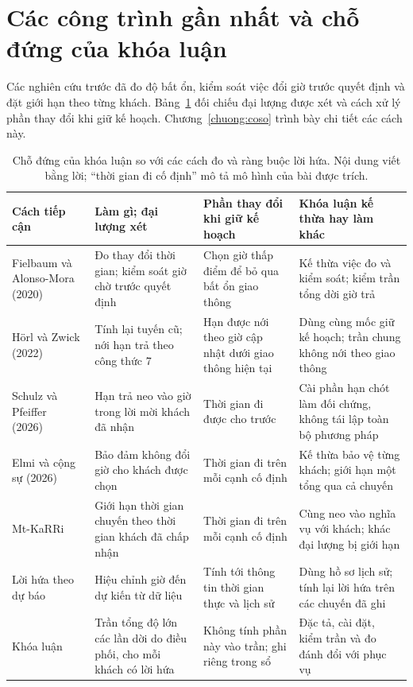 \section{Các công trình gần nhất và chỗ đứng của khóa luận}
\label{muc:c1-lienquan}

Các nghiên cứu trước đã đo độ bất ổn, kiểm soát việc đổi giờ trước quyết định và đặt giới hạn theo từng khách.
Bảng~\ref{bang:c1-chodung} đối chiếu đại lượng được xét và cách xử lý phần thay đổi khi giữ kế hoạch.
Chương~\ref{chuong:coso} trình bày chi tiết các cách này.

\begin{table}[htbp]
\centering
\caption{Chỗ đứng của khóa luận so với các cách đo và ràng buộc lời hứa. Nội dung viết bằng lời;
“thời gian đi cố định” mô tả mô hình của bài được trích.}
\label{bang:c1-chodung}
\footnotesize
\begin{tabular}{@{}p{2.8cm}p{4.0cm}p{3.3cm}p{4.5cm}@{}}
\toprule
\textbf{Cách tiếp cận} & \textbf{Làm gì; đại lượng xét} &
\textbf{Phần thay đổi khi giữ kế hoạch} & \textbf{Khóa luận kế thừa hay làm khác}\\
\midrule
Fielbaum và Alonso-Mora (2020)~\cite{fielbaum2020}
& Đo thay đổi thời gian; kiểm soát giờ chờ trước quyết định
& Chọn giờ thấp điểm để bỏ qua bất ổn giao thông
& Kế thừa việc đo và kiểm soát; kiểm trần tổng dời giờ trả\\
Hörl và Zwick (2022)~\cite{horl2022}
& Tính lại tuyến cũ; nới hạn trả theo công thức 7
& Hạn được nới theo giờ cập nhật dưới giao thông hiện tại
& Dùng cùng mốc giữ kế hoạch; trần chung không nới theo giao thông\\
Schulz và Pfeiffer (2026)~\cite{schulz2026}
& Hạn trả neo vào giờ trong lời mời khách đã nhận
& Thời gian đi được cho trước
& Cài phần hạn chót làm đối chứng, không tái lập toàn bộ phương pháp\\
Elmi và cộng sự (2026)~\cite{elmi2026}
& Bảo đảm không đổi giờ cho khách được chọn
& Thời gian đi trên mỗi cạnh cố định
& Kế thừa bảo vệ từng khách; giới hạn một tổng qua cả chuyến\\
Mt-KaRRi~\cite{laupichler2026}
& Giới hạn thời gian chuyến theo thời gian khách đã chấp nhận
& Thời gian đi trên mỗi cạnh cố định
& Cùng neo vào nghĩa vụ với khách; khác đại lượng bị giới hạn\\
Lời hứa theo dự báo~\cite{hu2022}
& Hiệu chỉnh giờ đến dự kiến từ dữ liệu
& Tính tới thông tin thời gian thực và lịch sử
& Dùng hồ sơ lịch sử; tính lại lời hứa trên các chuyến đã ghi\\
Khóa luận
& Trần tổng độ lớn các lần dời do điều phối, cho mỗi khách có lời hứa
& Không tính phần này vào trần; ghi riêng trong sổ
& Đặc tả, cài đặt, kiểm trần và đo đánh đổi với phục vụ\\
\bottomrule
\end{tabular}
\end{table}

